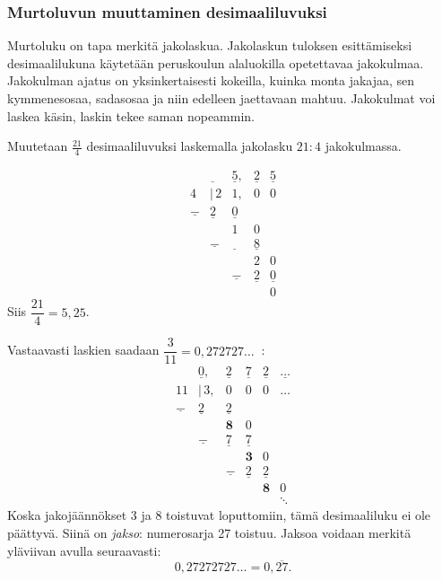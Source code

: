 \subsubsection*{Murtoluvun muuttaminen desimaaliluvuksi}

Murtoluku on tapa merkitä jakolaskua. Jakolaskun tuloksen esittämiseksi desimaalilukuna
käytetään peruskoulun alaluokilla opetettavaa jakokulmaa. Jakokulman ajatus on yksinkertaisesti kokeilla, kuinka monta jakajaa, sen kymmenesosaa, sadasosaa ja niin
edelleen jaettavaan mahtuu. Jakokulmat voi laskea käsin, laskin tekee saman nopeammin.

\begin{esimerkki}
Muutetaan $\frac{21}{4}$ desimaaliluvuksi laskemalla jakolasku $21 : 4$ jakokulmassa.

\[ 
\begin{array}{cccccc}
 & \underline{ \ \ } & \underline{5}, & \underline{2} & \underline{5} \\
 4 & \!\!|\,2 & 1, & 0 & 0 \\
 \underline{-} & \underline{2}& \underline{0} \\
 & & 1 &0 \\
 & \underline{-} &\underline{ \ \ }  & \underline{8} \\
 & & & 2 & 0 \\
 & & \underline{-} & \underline{2} & \underline{0} \\
 & &  & & 0
\end{array}
\]
Siis $\dfrac{21}{4} = 5,25$.
\end{esimerkki}

Vastaavasti laskien saadaan $\dfrac{3}{11}=0,272727\ldots \ $ :
\[ 
\begin{array}{cccccc}
 & \underline{ 0}, & \underline{2} & \underline{7} & \underline{2} & 
 \underline{\ldots} \\
 11 & \!\!|\,3, & 0 & 0 & 0 & \ldots \\
 \underline{-} & \underline{2}& \underline{2} \\
 & & \boldsymbol{8} &0 \\
 & \underline{-} &\underline{ 7 }  & \underline{7} \\
 & & & \boldsymbol{3} & 0 \\
 & & \underline{-} & \underline{2} & \underline{2} \\
 & &  & & \boldsymbol{8} & 0 \\
 & & & & & \ddots
\end{array}
\]
Koska jakojäännökset 3 ja 8 toistuvat loputtomiin, tämä desimaaliluku
ei ole päättyvä. Siinä on \emph{jakso}: numerosarja 27 toistuu.
Jaksoa voidaan merkitä yläviivan avulla seuraavasti:
\[ 0,27272727\ldots = 0,\overline{27}. \]


